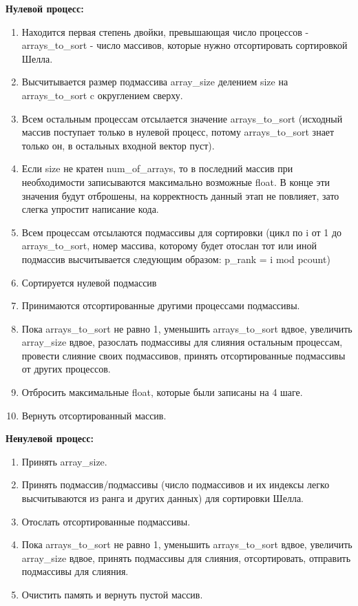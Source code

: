 \documentclass[14pt, a4paper]{extarticle}
\begin{document}
        \textbf{Нулевой процесс:}
        \begin{enumerate}
        \item Находится первая степень двойки, превышающая число процессов - arrays\_to\_sort - число массивов, которые нужно отсортировать сортировкой Шелла. 
        \item Высчитывается размер подмассива array\_size делением size на arrays\_to\_sort c округлением сверху.
        \item Всем остальным процессам отсылается значение arrays\_to\_sort (исходный массив поступает только в нулевой процесс, потому arrays\_to\_sort знает только он, в остальных входной вектор пуст).
        \item Если size не кратен num\_of\_arrays, то в последний массив при необходимости записываются максимально возможные float. В конце эти значения будут отброшены, на корректность данный этап не повлияет, зато слегка упростит написание кода.
        \item Всем процессам отсылаются подмассивы для сортировки (цикл по i от 1 до arrays\_to\_sort, номер массива, которому будет отослан тот или иной подмассив высчитывается следующим образом: p\_rank = i mod pcount)
        \item Сортируется нулевой подмассив
        \item Принимаются отсортированные другими процессами подмассивы.
        \item Пока arrays\_to\_sort не равно 1, уменьшить arrays\_to\_sort вдвое, увеличить array\_size вдвое, разослать подмассивы для слияния остальным процессам, провести слияние своих подмассивов, принять отсортированные подмассивы от других процессов.
        \item Отбросить максимальные float, которые были записаны на 4 шаге.
        \item Вернуть отсортированный массив.
        \end{enumerate}

        \textbf{Ненулевой процесс:}
        \begin{enumerate}
        \item Принять array\_size. 
        \item Принять подмассив/подмассивы (число подмассивов и их индексы легко высчитываются из ранга и других данных) для сортировки Шелла.
        \item Отослать отсортированные подмассивы.
        \item Пока arrays\_to\_sort не равно 1, уменьшить arrays\_to\_sort вдвое, увеличить array\_size вдвое, принять подмассивы для слияния, отсортировать, отправить подмассивы для слияния.
        \item Очистить память и вернуть пустой массив.
        \end{enumerate}
\end{document}

